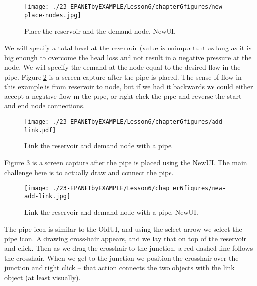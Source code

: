 \begin{figure}[h!] %
   \centering
   \texttt{[image: ./23-EPANETbyEXAMPLE/Lesson6/chapter6figures/new-place-nodes.jpg]} 
   \caption{Place the reservoir and the demand node, NewUI.}
   \label{fig:new-place-nodes}
\end{figure}

We will specify a total head at the reservoir (value is unimportant as long as it is big enough to overcome the head loss and not result in a negative pressure at the node.   We will specify the demand at the node equal to the desired flow in the pipe.     Figure \ref{fig:add-link} is a screen capture after the pipe is placed.  The sense of flow in this example is from reservoir to node, but if we had it backwards we could either accept a negative flow in the pipe, or right-click the pipe and reverse the start and end node connections.

\begin{figure}[h!] %
   \centering
   \texttt{[image: ./23-EPANETbyEXAMPLE/Lesson6/chapter6figures/add-link.pdf]} 
   \caption{Link the reservoir and demand node with a pipe.}
   \label{fig:add-link}
\end{figure}

Figure \ref{fig:new-add-link} is a screen capture after the pipe is placed using the NewUI.
The main challenge here is to actually draw and connect the pipe.


\begin{figure}[h!] %
   \centering
   \texttt{[image: ./23-EPANETbyEXAMPLE/Lesson6/chapter6figures/new-add-link.jpg]} 
   \caption{Link the reservoir and demand node with a pipe, NewUI.}
   \label{fig:new-add-link}
\end{figure}
The pipe icon is similar to the OldUI, and using the select arrow we select the pipe icon.
A drawing cross-hair appears, and we lay that on top of the reservoir and click.
Then as we drag the crosshair to the junction, a red dashed line follows the crosshair.
When we get to the junction we position the crosshair over the junction and right click -- that action connects the two objects with the link object (at least visually).

